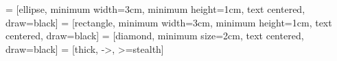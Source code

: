 \newenvironment{pseudocode}
{\setlength{\parskip}{-1cm}\SetNlSty{}{}{.}\begin{flushleft}\begin{colboxTre}{EFF0F1}\begin{algorithm}[H]}
{\end{algorithm}\end{colboxTre}\end{flushleft}\setlength{\parskip}{0cm}}




 = [ellipse, minimum width=3cm, minimum height=1cm, text centered, draw=black] %
 = [rectangle, minimum width=3cm, minimum height=1cm, text centered, draw=black] %
 = [diamond, minimum size=2cm, text centered, draw=black] %
 = [thick, ->, >=stealth] %